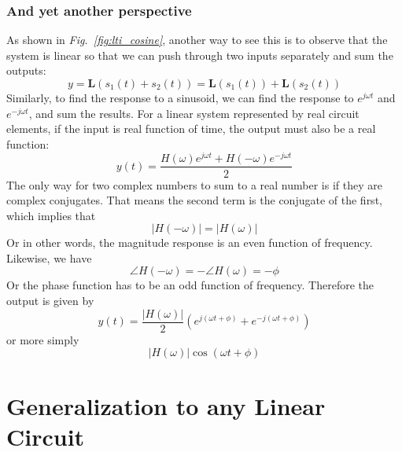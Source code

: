 \subsubsection{And yet another perspective}
As shown in \emph{Fig.~\ref{fig:lti_cosine}}, another way to see this is to observe that the system is linear so that we can push through two inputs separately and sum the outputs:
    \begin{equation}
        y = \mathbf{L}(s_1(t) + s_2(t)) = \mathbf{L}(s_1(t)) + \mathbf{L}(s_2(t))
    \end{equation}
Similarly, to find the response to a sinusoid, we can find the response to $e^{j\omega t}$ and $e^{-j\omega t}$, and sum the results.  For a linear system represented by real circuit elements, if  the input is real function of time, the output must also be a real function:
    \begin{equation}
        y(t) = \frac{H(\omega) e^{j\omega t} + H(-\omega) e^{-j\omega t} }{2}
    \end{equation}
The only way for two complex numbers to sum to a real number is if they are complex conjugates.  That means the second term is the conjugate of the first, which implies that
    \begin{equation}
        |H(-\omega)| = |H(\omega)|
    \end{equation}
Or in other words, the magnitude response is an even function of frequency.  Likewise, we have
    \begin{equation}
        \angle H(-\omega) = -\angle H(\omega) = - \phi
    \end{equation}
Or the phase function has to be an odd function of frequency.  Therefore the output is given by
    \begin{equation}
        y(t) = \frac{|H(\omega)|}{2} \left( e^{j(\omega t + \phi)} + e^{-j(\omega t + \phi)} \right)
    \end{equation}
or more simply
    \begin{equation}
        |H(\omega)| \cos(\omega t + \phi)
    \end{equation}
\section{Generalization to any Linear Circuit}
